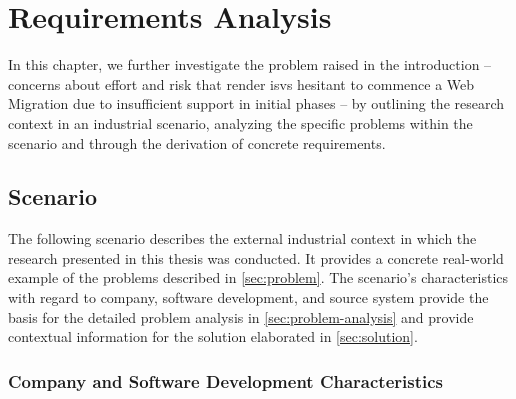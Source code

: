 \hypertarget{sec:requirements-analysis}{%
\chapter{Requirements Analysis}\label{sec:requirements-analysis}}

In this chapter, we further investigate the problem raised in the introduction -- concerns about effort and risk that render \glspl{isv} hesitant to commence a \gls{Web Migration} due to insufficient support in initial phases -- by outlining the research context in an industrial scenario, analyzing the specific problems within the scenario and through the derivation of concrete requirements.

\vspace{-15pt}
\hypertarget{sec:scenario}{%
\section{Scenario}\label{sec:scenario}}
\vspace{15pt}

The following scenario describes the external industrial context in which the research presented in this thesis was conducted.
It provides a concrete real-world example of the problems described in \cref{sec:problem}.
The scenario's characteristics with regard to company, software development, and \gls{source system} provide the basis for the detailed problem analysis in \cref{sec:problem-analysis} and provide contextual information for the solution elaborated in \cref{sec:solution}.

\vspace{-10pt}
\hypertarget{sec:company-characteristics}{%
\subsection[Company \& Software Development Characteristics]{Company and Software Development Characteristics}\label{sec:company-characteristics}}
\vspace{10pt}


